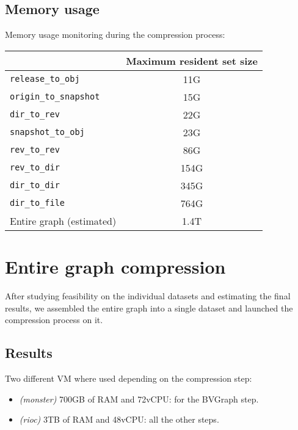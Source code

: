 \documentclass[11pt,a4paper]{article}
\begin{document}
\subsection{Memory usage}

Memory usage monitoring during the compression process:

\begin{center}
    \begin{tabular}{@{} l c @{}}
        \toprule
        \multicolumn{1}{c}{} &
            \textbf{Maximum resident set size} \\
        \midrule
        \texttt{release\_to\_obj} & 11G \\
        \texttt{origin\_to\_snapshot} & 15G \\
        \texttt{dir\_to\_rev} & 22G \\
        \texttt{snapshot\_to\_obj} & 23G \\
        \texttt{rev\_to\_rev} & 86G \\
        \texttt{rev\_to\_dir} & 154G \\
        \texttt{dir\_to\_dir} & 345G \\
        \texttt{dir\_to\_file} & 764G \\
        \midrule
        Entire graph (estimated) & 1.4T \\
        \bottomrule
    \end{tabular}
\end{center}

\section{Entire graph compression}

After studying feasibility on the individual datasets and estimating the final
results, we assembled the entire graph into a single dataset and launched the
compression process on it.

\subsection{Results}

Two different VM where used depending on the compression step:

\begin{itemize}
    \item \textit{(monster)} 700GB of RAM and 72vCPU: for the BVGraph step.
    \item \textit{(rioc)} 3TB of RAM and 48vCPU: all the other steps.
\end{itemize}
\end{document}
